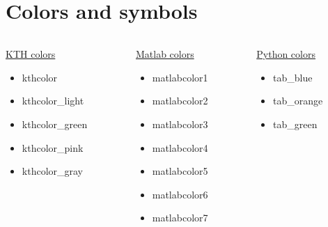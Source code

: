 \documentclass[aspectratio=1610,11pt]{beamer}
\begin{document}
\section{Colors and symbols}
\begin{frame}{\insertsection}
    \begin{columns}[t]
        \begin{column}{0.24\textwidth}
            \underline{KTH colors}
            \begin{itemize}
                \item \textcolor{kthcolor}{kthcolor}
                \item \textcolor{kthcolor_light}{kthcolor\_light}
                \item \textcolor{kthcolor_green}{kthcolor\_green}
                \item \textcolor{kthcolor_pink}{kthcolor\_pink}
                \item \textcolor{kthcolor_gray}{kthcolor\_gray}
            \end{itemize}
        \end{column}
        \begin{column}{0.24\textwidth}
            \underline{Matlab colors}
            \begin{itemize}
                \item \textcolor{matlabcolor1}{matlabcolor1}
                \item \textcolor{matlabcolor2}{matlabcolor2}
                \item \textcolor{matlabcolor3}{matlabcolor3}
                \item \textcolor{matlabcolor4}{matlabcolor4}
                \item \textcolor{matlabcolor5}{matlabcolor5}
                \item \textcolor{matlabcolor6}{matlabcolor6}
                \item \textcolor{matlabcolor7}{matlabcolor7}
            \end{itemize}
        \end{column}
        \begin{column}{0.24\textwidth}
            \underline{Python colors}
            \begin{itemize}
            \item \textcolor{tab_blue}{tab\_blue}
            \item \textcolor{tab_orange}{tab\_orange}
            \item \textcolor{tab_green}{tab\_green}

\end{itemize}
\end{column}
\end{columns}
\end{frame}
\end{document}
